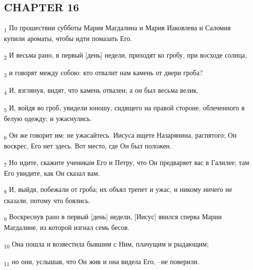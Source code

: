 \subsection{CHAPTER 16}
\begin{tcolorbox}
\textsubscript{1} По прошествии субботы Мария Магдалина и Мария Иаковлева и Саломия купили ароматы, чтобы идти помазать Его.
\end{tcolorbox}
\begin{tcolorbox}
\textsubscript{2} И весьма рано, в первый [день] недели, приходят ко гробу, при восходе солнца,
\end{tcolorbox}
\begin{tcolorbox}
\textsubscript{3} и говорят между собою: кто отвалит нам камень от двери гроба?
\end{tcolorbox}
\begin{tcolorbox}
\textsubscript{4} И, взглянув, видят, что камень отвален; а он был весьма велик.
\end{tcolorbox}
\begin{tcolorbox}
\textsubscript{5} И, войдя во гроб, увидели юношу, сидящего на правой стороне, облеченного в белую одежду; и ужаснулись.
\end{tcolorbox}
\begin{tcolorbox}
\textsubscript{6} Он же говорит им: не ужасайтесь. Иисуса ищете Назарянина, распятого; Он воскрес, Его нет здесь. Вот место, где Он был положен.
\end{tcolorbox}
\begin{tcolorbox}
\textsubscript{7} Но идите, скажите ученикам Его и Петру, что Он предваряет вас в Галилее; там Его увидите, как Он сказал вам.
\end{tcolorbox}
\begin{tcolorbox}
\textsubscript{8} И, выйдя, побежали от гроба; их объял трепет и ужас, и никому ничего не сказали, потому что боялись.
\end{tcolorbox}
\begin{tcolorbox}
\textsubscript{9} Воскреснув рано в первый [день] недели, [Иисус] явился сперва Марии Магдалине, из которой изгнал семь бесов.
\end{tcolorbox}
\begin{tcolorbox}
\textsubscript{10} Она пошла и возвестила бывшим с Ним, плачущим и рыдающим;
\end{tcolorbox}
\begin{tcolorbox}
\textsubscript{11} но они, услышав, что Он жив и она видела Его, --не поверили.
\end{tcolorbox}
